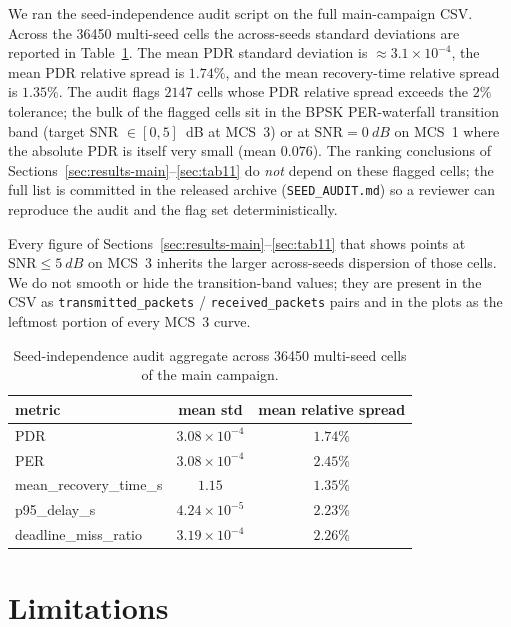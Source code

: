 \documentclass[journal,onecolumn,11pt,a4paper]{IEEEtran}
\begin{document}
We ran the seed-independence audit script on the full main-campaign
CSV. Across the \num{36450} multi-seed cells the across-seeds standard
deviations are reported in Table~\ref{tab:seed-audit}. The mean PDR
standard deviation is $\approx 3.1\times 10^{-4}$, the mean PDR
relative spread is $1.74\%$, and the mean recovery-time relative
spread is $1.35\%$. The audit flags $2147$ cells whose PDR relative
spread exceeds the $2\%$ tolerance; the bulk of the flagged cells sit
in the BPSK PER-waterfall transition band (target SNR
$\in [0, 5]$~dB at MCS~3) or at $\mathrm{SNR}=\SI{0}{dB}$ on MCS~1
where the absolute PDR is itself very small (mean $0.076$). The
ranking conclusions of Sections~\ref{sec:results-main}--\ref{sec:tab11}
do \emph{not} depend on these flagged cells; the full list is
committed in the released archive (\texttt{SEED\_AUDIT.md}) so a
reviewer can reproduce the audit and the flag set deterministically.

Every figure of Sections~\ref{sec:results-main}--\ref{sec:tab11} that
shows points at $\mathrm{SNR}\le \SI{5}{dB}$ on MCS~3 inherits the
larger across-seeds dispersion of those cells. We do not smooth or
hide the transition-band values; they are present in the CSV as
\texttt{transmitted\_packets} / \texttt{received\_packets} pairs and
in the plots as the leftmost portion of every MCS~3 curve.

\begin{table}[t]
  \centering
  \caption{Seed-independence audit aggregate across \num{36450}
  multi-seed cells of the main campaign.}
  \label{tab:seed-audit}
  \begin{tabular}{l c c}
    \toprule
    metric & mean std & mean relative spread \\
    \midrule
    PDR                              & $3.08\times 10^{-4}$ & $1.74\%$ \\
    PER                              & $3.08\times 10^{-4}$ & $2.45\%$ \\
    mean\_recovery\_time\_s          & $1.15$               & $1.35\%$ \\
    p95\_delay\_s                    & $4.24\times 10^{-5}$ & $2.23\%$ \\
    deadline\_miss\_ratio            & $3.19\times 10^{-4}$ & $2.26\%$ \\
    \bottomrule
  \end{tabular}
\end{table}

\section{Limitations}
\label{sec:limitations}
\end{document}
